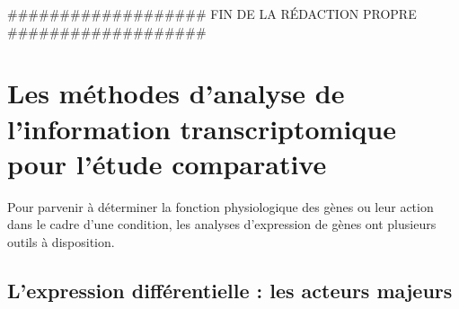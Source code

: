 



\#\#\#\#\#\#\#\#\#\#\#\#\#\#\#\#\#\#\# FIN DE LA RÉDACTION PROPRE \#\#\#\#\#\#\#\#\#\#\#\#\#\#\#\#\#\#\#
 







\section{Les méthodes d'analyse de l'information transcriptomique pour l'étude comparative}

Pour parvenir à déterminer la fonction physiologique des gènes ou leur action dans le cadre d'une condition, les analyses d'expression de gènes ont plusieurs outils à disposition. 



\subsection{L'expression différentielle : les acteurs majeurs}



